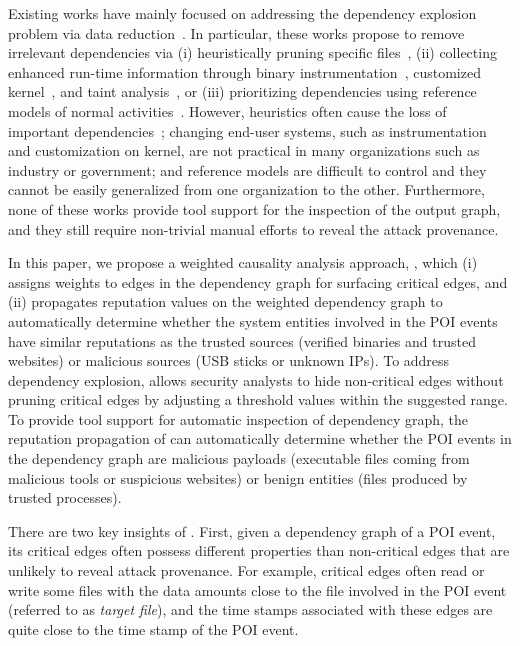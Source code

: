 Existing works have mainly focused on addressing the dependency explosion problem via data reduction~\cite{backtracking,backtracking2,taser,intrusionrecovery}.
In particular, these works propose to remove irrelevant dependencies via (i) heuristically pruning specific files~\cite{backtracking,backtracking2}, (ii) collecting enhanced run-time information through binary instrumentation~\cite{mcitracking,loggc}, customized kernel~\cite{trustkernel}, and taint analysis~\cite{ma2016protracer}, or (iii) prioritizing dependencies using reference models of normal activities~\cite{timelytrack}.
However, heuristics often cause the loss of important dependencies~\cite{backtracking,reduction}; 
changing end-user systems, such as instrumentation and customization on kernel, are not practical in many organizations such as industry or government;
and reference models are difficult to control and they cannot be easily generalized from one organization to the other.
Furthermore, none of these works provide tool support for the inspection of the output graph,
and they still require non-trivial manual efforts to reveal the attack provenance. 

In this paper, we propose a weighted causality analysis approach, \tool, which (i) assigns weights to edges in the dependency graph for surfacing critical edges,
and (ii) propagates reputation values on the weighted dependency graph to automatically determine whether the system entities involved in the POI events have similar reputations as the trusted sources (\eg verified binaries and trusted websites) or malicious sources (\eg USB sticks or unknown IPs). 
To address dependency explosion, \tool allows security analysts to hide non-critical edges without pruning critical edges by adjusting a threshold values within the suggested range.
To provide tool support for automatic inspection of dependency graph, the reputation propagation of \tool can automatically determine whether the POI events in the dependency graph are malicious payloads (\eg executable files coming from malicious tools or suspicious websites) or benign entities (\eg files produced by trusted processes). 

There are two key insights of \tool.
First, given a dependency graph of a POI event, its critical edges often possess different properties than non-critical edges that are unlikely to reveal attack provenance.
For example, critical edges often read or write some files with the data amounts close to the file involved in the POI event (referred to as \emph{target file}), and the time stamps associated with these edges are quite close to the time stamp of the POI event. 

